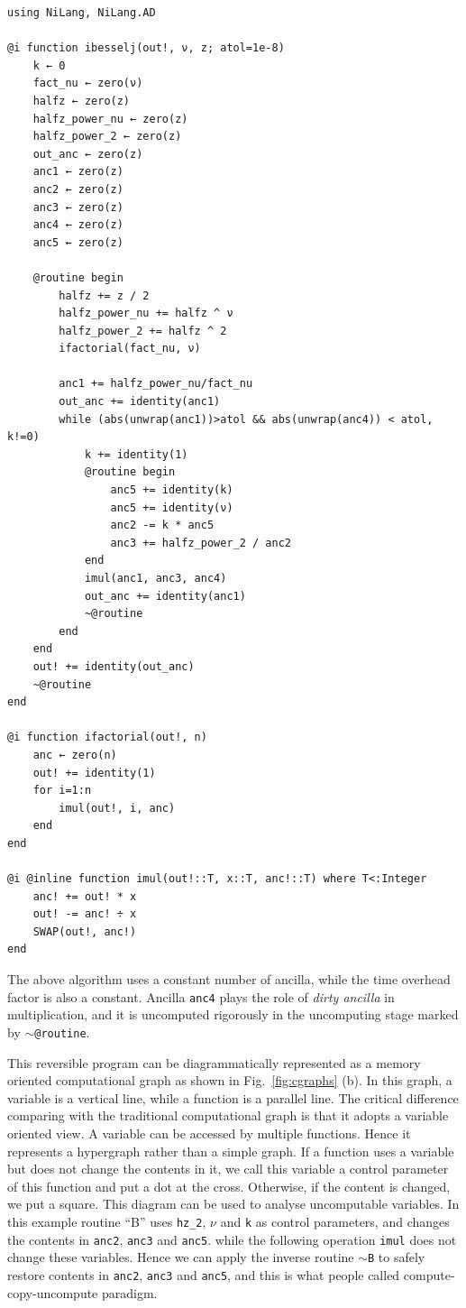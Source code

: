 \documentclass{article}
\newcommand{\<}{\langle}
\renewcommand{\>}{\rangle}
\newcommand{\Fig}[1]{Fig.~\ref{#1}}
\theoremstyle{definition}\newtheorem{definition}{\textit{Definition}}
\begin{document}
\begin{minipage}{\columnwidth}
\begin{lstlisting}[multicols=2]
using NiLang, NiLang.AD

@i function ibesselj(out!, ν, z; atol=1e-8)
    k ← 0
    fact_nu ← zero(ν)
    halfz ← zero(z)
    halfz_power_nu ← zero(z)
    halfz_power_2 ← zero(z)
    out_anc ← zero(z)
    anc1 ← zero(z)
    anc2 ← zero(z)
    anc3 ← zero(z)
    anc4 ← zero(z)
    anc5 ← zero(z)

    @routine begin
        halfz += z / 2
        halfz_power_nu += halfz ^ ν
        halfz_power_2 += halfz ^ 2
        ifactorial(fact_nu, ν)

        anc1 += halfz_power_nu/fact_nu
        out_anc += identity(anc1)
        while (abs(unwrap(anc1))>atol && abs(unwrap(anc4)) < atol, k!=0)
            k += identity(1)
            @routine begin
                anc5 += identity(k)
                anc5 += identity(ν)
                anc2 -= k * anc5
                anc3 += halfz_power_2 / anc2
            end
            imul(anc1, anc3, anc4)
            out_anc += identity(anc1)
            ~@routine
        end
    end
    out! += identity(out_anc)
    ~@routine
end

@i function ifactorial(out!, n)
    anc ← zero(n)
    out! += identity(1)
    for i=1:n
        imul(out!, i, anc)
    end
end

@i @inline function imul(out!::T, x::T, anc!::T) where T<:Integer
    anc! += out! * x
    out! -= anc! ÷ x
    SWAP(out!, anc!)
end
\end{lstlisting}
\end{minipage}

The above algorithm uses a constant number of ancilla, while the time overhead factor is also a constant.
Ancilla \texttt{anc4} plays the role of \textit{dirty ancilla} in multiplication, and it is uncomputed rigorously in the uncomputing stage marked by \texttt{$\sim$@routine}.

This reversible program can be diagrammatically represented as a memory oriented computational graph as shown in \Fig{fig:cgraphs} (b).
In this graph, a variable is a vertical line, while a function is a parallel line.
The critical difference comparing with the traditional computational graph is that it adopts a variable oriented view.
A variable can be accessed by multiple functions. Hence it represents a hypergraph rather than a simple graph.
If a function uses a variable but does not change the contents in it, we call this variable a control parameter of this function and put a dot at the cross. Otherwise, if the content is changed, we put a square.
This diagram can be used to analyse uncomputable variables. In this example routine ``B'' uses \texttt{hz\_2}, \texttt{$\nu$} and \texttt{k} as control parameters, and changes the contents in \texttt{anc2}, \texttt{anc3} and \texttt{anc5}.
while the following operation \texttt{imul} does not change these variables.
Hence we can apply the inverse routine \texttt{$\sim$B} to safely restore contents in \texttt{anc2}, \texttt{anc3} and \texttt{anc5}, and this is what people called compute-copy-uncompute paradigm.
\end{document}
